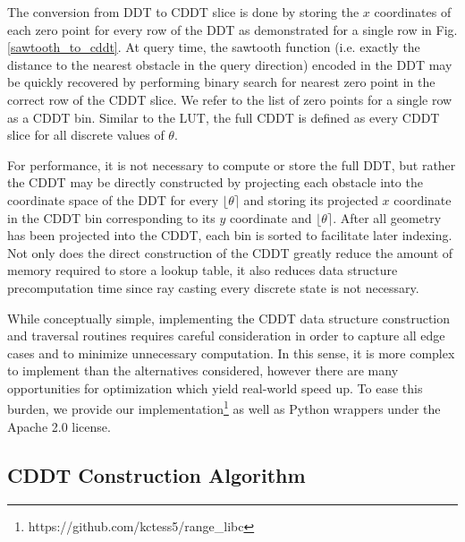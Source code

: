 \documentclass[letterpaper, 10 pt, conference]{ieeeconf}  %
\begin{document}

The conversion from DDT to CDDT slice is done by storing the $x$ coordinates of each zero point for every row of the DDT as demonstrated for a single row in Fig. \ref{sawtooth_to_cddt}. At query time, the sawtooth function (i.e. exactly the distance to the nearest obstacle in the query direction) encoded in the DDT may be quickly recovered by performing binary search for nearest zero point in the correct row of the CDDT slice. We refer to the list of zero points for a single row as a CDDT bin. Similar to the LUT, the full CDDT is defined as every CDDT slice for all discrete values of $\theta$.

For performance, it is not necessary to compute or store the full DDT, but rather the CDDT may be directly constructed by projecting each obstacle into the coordinate space of the DDT for every $\lfloor\theta\rceil$ and storing its projected $x$ coordinate in the CDDT bin corresponding to its $y$ coordinate and $\lfloor\theta\rceil$. After all geometry has been projected into the CDDT, each bin is sorted to facilitate later indexing. Not only does the direct construction of the CDDT greatly reduce the amount of memory required to store a lookup table, it also reduces data structure precomputation time since ray casting every discrete state is not necessary.

While conceptually simple, implementing the CDDT data structure construction and traversal routines requires careful consideration in order to capture all edge cases and to minimize unnecessary computation. In this sense, it is more complex to implement than the alternatives considered, however there are many opportunities for optimization which yield real-world speed up. To ease this burden, we provide our implementation\footnote{https://github.com/kctess5/range\_libc} as well as Python wrappers under the Apache 2.0 license.

\subsection{CDDT Construction Algorithm}
\end{document}
